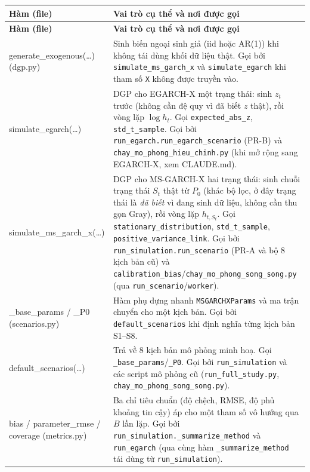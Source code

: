 \documentclass[11pt,a4paper]{article}
\newcommand{\code}[1]{\texttt{#1}}
\begin{document}
\begin{longtable}{@{}>{\ttfamily\scriptsize\raggedright\arraybackslash}p{5.0cm} >{\raggedright\arraybackslash}p{9.5cm}@{}}
\toprule
\textbf{\normalfont Hàm (file)} & \textbf{Vai trò cụ thể và nơi được gọi} \\
\midrule
\endfirsthead
\toprule
\textbf{\normalfont Hàm (file)} & \textbf{Vai trò cụ thể và nơi được gọi} \\
\midrule
\endhead
\bottomrule
\endfoot
generate\_exogenous(\ldots) \newline \footnotesize{(dgp.py)} & Sinh biến ngoại sinh giả (iid hoặc AR(1)) khi không tái dùng khối dữ liệu thật. Gọi bởi \code{simulate\_ms\_garch\_x} và \code{simulate\_egarch} khi tham số \code{X} không được truyền vào. \\
simulate\_egarch(\ldots) & DGP cho EGARCH-X một trạng thái: sinh $z_t$ trước (không cần đệ quy vì đã biết $z$ thật), rồi vòng lặp $\log h_t$. Gọi \code{expected\_abs\_z}, \code{std\_t\_sample}. Gọi bởi \code{run\_egarch.run\_egarch\_scenario} (PR-B) và \code{chay\_mo\_phong\_hieu\_chinh.py} (khi mở rộng sang EGARCH-X, xem CLAUDE.md). \\
simulate\_ms\_garch\_x(\ldots) & DGP cho MS-GARCH-X hai trạng thái: sinh chuỗi trạng thái $S_t$ thật từ $P_0$ (khác bộ lọc, ở đây trạng thái là \emph{đã biết} vì đang sinh dữ liệu, không cần thu gọn Gray), rồi vòng lặp $h_{t,S_t}$. Gọi \code{stationary\_distribution}, \code{std\_t\_sample}, \code{positive\_variance\_link}. Gọi bởi \code{run\_simulation.run\_scenario} (PR-A và bộ 8 kịch bản cũ) và \code{calibration\_bias}/\code{chay\_mo\_phong\_song\_song.py} (qua \code{run\_scenario}/\code{worker}). \\
\_base\_params / \_P0 \newline \footnotesize{(scenarios.py)} & Hàm phụ dựng nhanh \code{MSGARCHXParams} và ma trận chuyển cho một kịch bản. Gọi bởi \code{default\_scenarios} khi định nghĩa từng kịch bản S1--S8. \\
default\_scenarios(\ldots) & Trả về 8 kịch bản mô phỏng minh hoạ. Gọi \code{\_base\_params}/\code{\_P0}. Gọi bởi \code{run\_simulation} và các script mô phỏng cũ (\code{run\_full\_study.py}, \code{chay\_mo\_phong\_song\_song.py}). \\
bias / parameter\_rmse / coverage \newline \footnotesize{(metrics.py)} & Ba chỉ tiêu chuẩn (độ chệch, RMSE, độ phủ khoảng tin cậy) áp cho một tham số vô hướng qua $B$ lần lặp. Gọi bởi \code{run\_simulation.\_summarize\_method} và \code{run\_egarch} (qua cùng hàm \code{\_summarize\_method} tái dùng từ \code{run\_simulation}). \\

\end{longtable}
\end{document}
